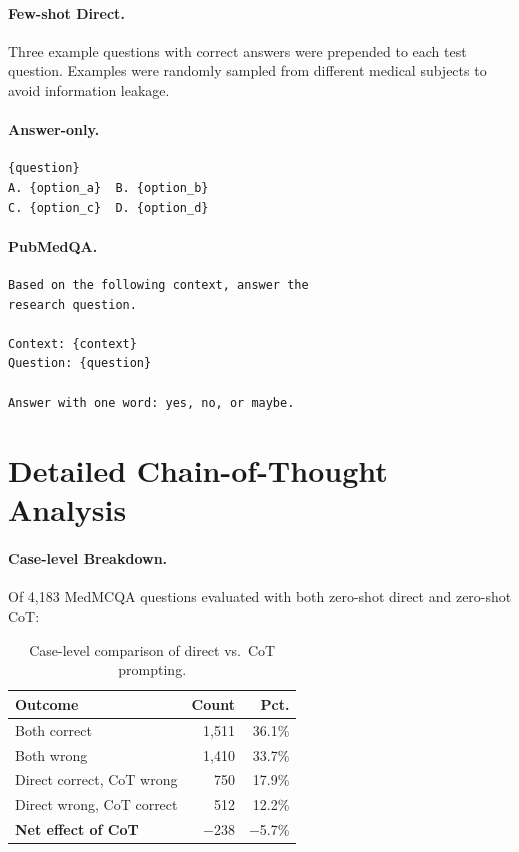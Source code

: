 \documentclass[runningheads,a4paper]{llncs}
\begin{document}
\paragraph{Few-shot Direct.}
Three example questions with correct answers were prepended to each test question. Examples were randomly sampled from different medical subjects to avoid information leakage.

\paragraph{Answer-only.}
\begin{verbatim}
{question}
A. {option_a}  B. {option_b}
C. {option_c}  D. {option_d}
\end{verbatim}

\paragraph{PubMedQA.}
\begin{verbatim}
Based on the following context, answer the
research question.

Context: {context}
Question: {question}

Answer with one word: yes, no, or maybe.
\end{verbatim}

\section{Detailed Chain-of-Thought Analysis}\label{app:cot}

\paragraph{Case-level Breakdown.}
Of 4,183 MedMCQA questions evaluated with both zero-shot direct and zero-shot CoT:

\begin{table}[t]
\centering
\caption{Case-level comparison of direct vs.\ CoT prompting.}
\label{tab:cot_cases}
\begin{tabular}{lrr}
\toprule
\textbf{Outcome} & \textbf{Count} & \textbf{Pct.} \\
\midrule
Both correct & 1,511 & 36.1\% \\
Both wrong & 1,410 & 33.7\% \\
Direct correct, CoT wrong & 750 & 17.9\% \\
Direct wrong, CoT correct & 512 & 12.2\% \\
\midrule
\textbf{Net effect of CoT} & $-$238 & $-$5.7\% \\
\bottomrule
\end{tabular}
\end{table}
\end{document}
